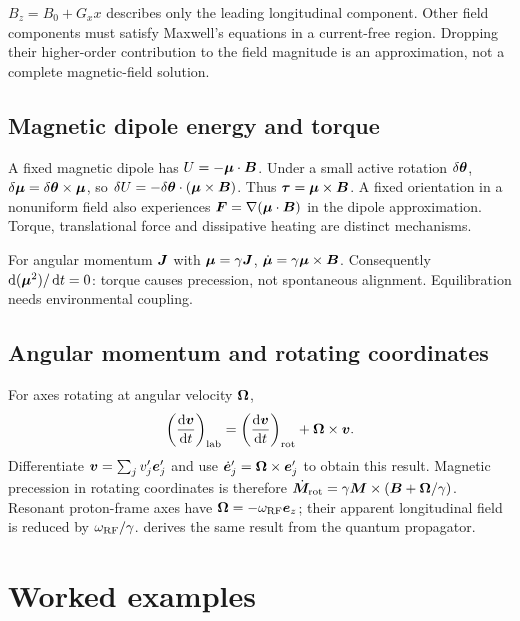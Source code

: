 $B_z=B_0+G_xx$ describes only the leading longitudinal component.
Other field components must satisfy Maxwell's equations in a current-free
region. Dropping their higher-order contribution to the field magnitude
is an approximation, not a complete magnetic-field solution.

\subsection{Magnetic dipole energy and torque}
A fixed magnetic dipole has $U=-\bm{\mu}\cdot\bm{B}$.
Under a small active rotation $\delta\bm{\theta}$,
$\delta\bm{\mu}=\delta\bm{\theta}\times\bm{\mu}$, so
$\delta U=-\delta\bm{\theta}\cdot(\bm{\mu}\times\bm{B})$.
Thus $\bm{\tau}=\bm{\mu}\times\bm{B}$.
A fixed orientation in a nonuniform field also experiences
$\bm{F}=\nabla(\bm{\mu}\cdot\bm{B})$ in the dipole approximation.
Torque, translational force and dissipative heating are distinct mechanisms.

For angular momentum $\bm{J}$ with $\bm{\mu}=\gamma\bm{J}$,
$\dot{\bm{\mu}}=\gamma\bm{\mu}\times\bm{B}$.
Consequently $\mathop{}\!\mathrm{d}(\bm{\mu}^2)/\mathop{}\!\mathrm{d} t=0$: torque causes precession,
not spontaneous alignment. Equilibration needs environmental coupling.

\subsection{Angular momentum and rotating coordinates}
For axes rotating at angular velocity $\bm{\Omega}$,
\[
 \left(\frac{\mathop{}\!\mathrm{d}\bm{v}}{\mathop{}\!\mathrm{d} t}\right)_{\rm lab}
 =\left(\frac{\mathop{}\!\mathrm{d}\bm{v}}{\mathop{}\!\mathrm{d} t}\right)_{\rm rot}
       +\bm{\Omega}\times\bm{v} .
\]
Differentiate $\bm{v}=\sum_jv'_j\bm{e}'_j$ and use
$\dot{\bm{e}}'_j=\bm{\Omega}\times\bm{e}'_j$ to obtain this result.
Magnetic precession in rotating coordinates is therefore
$\dot{\bm{M}}_{\rm rot}=\gamma\bm{M}\times
(\bm{B}+\bm{\Omega}/\gamma)$.
Resonant proton-frame axes have
$\bm{\Omega}=-\omega_{\rm RF}\bm{e}_z$; their apparent longitudinal
field is reduced by $\omega_{\rm RF}/\gamma$.
 derives the same result from the quantum propagator.

\section{Worked examples}
\label{sec:01:worked-examples}

